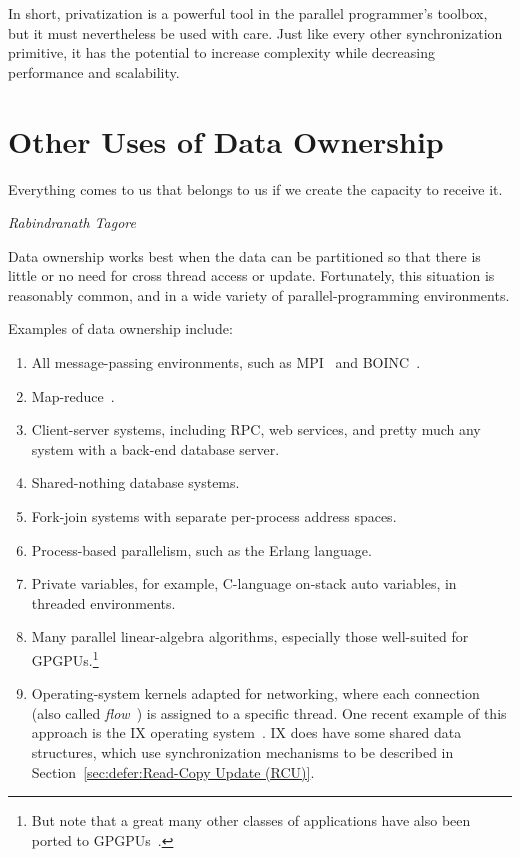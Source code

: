 In short, privatization is a powerful tool in the parallel programmer's
toolbox, but it must nevertheless be used with care.
Just like every other synchronization primitive, it has the potential
to increase complexity while decreasing performance and scalability.

\section{Other Uses of Data Ownership}
\label{sec:owned:Other Uses of Data Ownership}
%
\epigraph{Everything comes to us that belongs to us if we create the
	  capacity to receive it.}
	 {\emph{Rabindranath Tagore}}

Data ownership works best when the data can be partitioned so that there
is little or no need for cross thread access or update.
Fortunately, this situation is reasonably common, and in a wide variety
of parallel-programming environments.

Examples of data ownership include:

\begin{enumerate}
\item	All message-passing environments, such as MPI~\cite{MPIForum2008}
	and BOINC~\cite{BOINC2008}.
\item	Map-reduce~\cite{MapReduce2008MIT}.
\item	Client-server systems, including RPC, web services, and
	pretty much any system with a back-end database server.
\item	Shared-nothing database systems.
\item	Fork-join systems with separate per-process address spaces.
\item	Process-based parallelism, such as the Erlang language.
\item	Private variables, for example, C-language on-stack auto variables,
	in threaded environments.
\item	Many parallel linear-algebra algorithms, especially those
	well-suited for GPGPUs.\footnote{
		But note that a great many other classes of applications
		have also been ported to
		GPGPUs~\cite{NormMatloff2013ParProcBook,AMD2017OpenCL,NVidia2017GPGPU,NVidia2017GPGPU-university}.}
\item	Operating-system kernels adapted for networking, where each connection
	(also called \emph{flow}~\cite{Shenker89,ZhangPhD,McKenney90})
	is assigned to a specific thread.
	One recent example of this approach is the IX operating
	system~\cite{Belay:2016:IOS:3014162.2997641}.
	IX does have some shared data structures, which use synchronization
	mechanisms to be described in
	Section~\ref{sec:defer:Read-Copy Update (RCU)}.
\end{enumerate}

